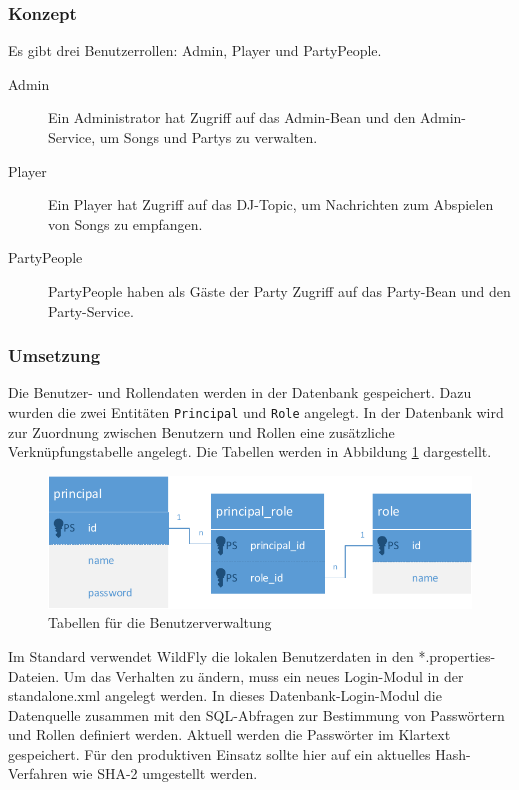 \subsubsection{Konzept}
Es gibt drei Benutzerrollen: Admin, Player und PartyPeople.
\begin{description}
	\item[Admin] Ein Administrator hat Zugriff auf das Admin-Bean und den Admin-Service, um Songs und Partys zu verwalten.
	\item[Player] Ein Player hat Zugriff auf das DJ-Topic, um Nachrichten zum Abspielen von Songs zu empfangen.
	\item[PartyPeople] PartyPeople haben als Gäste der Party Zugriff auf das Party-Bean und den Party-Service.
\end{description}

\subsubsection{Umsetzung}
Die Benutzer- und Rollendaten werden in der Datenbank gespeichert. Dazu wurden die zwei Entitäten \texttt{Principal} und \texttt{Role} angelegt. In der Datenbank wird zur Zuordnung zwischen Benutzern und Rollen eine zusätzliche Verknüpfungstabelle angelegt. Die Tabellen werden in Abbildung \ref{fig:BenutzerRollen} dargestellt.

\begin{figure}[tbh]
\centering
\includegraphics[width=1.0\linewidth]{Bilder/BenutzerRollen}
\caption{Tabellen für die Benutzerverwaltung}
\label{fig:BenutzerRollen}
\end{figure}

Im Standard verwendet WildFly die lokalen Benutzerdaten in den *.properties-Dateien. Um das Verhalten zu ändern, muss ein neues Login-Modul in der standalone.xml angelegt werden. In dieses Datenbank-Login-Modul die Datenquelle zusammen mit den SQL-Abfragen zur Bestimmung von Passwörtern und Rollen definiert werden. Aktuell werden die Passwörter im Klartext gespeichert. Für den produktiven Einsatz sollte hier auf ein aktuelles Hash-Verfahren wie SHA-2 umgestellt werden.

